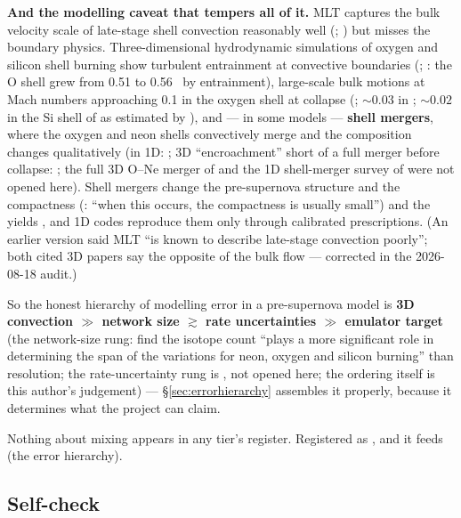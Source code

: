 \textbf{And the modelling caveat that tempers all of it.} MLT captures the bulk
velocity scale of late-stage shell convection reasonably well
(\citealt{meakin2007}; \citealt{muller2016b}) but misses the boundary physics.
Three-dimensional hydrodynamic simulations of oxygen and silicon shell burning
show turbulent entrainment at convective boundaries (\citealt{meakin2007};
\citealt{muller2016b}: the O shell grew from 0.51 to 0.56~\Msun{} by
entrainment), large-scale bulk motions at Mach numbers approaching 0.1 in the
oxygen shell at collapse (\citealt{muller2016b}; ${\sim}0.03$ in
\citealt{meakin2007}; ${\sim}0.02$ in the Si shell of \citealt{couch2015} as
estimated by \citealt{muller2016b}), and --- in some models --- \textbf{shell
mergers}, where the oxygen and neon shells convectively merge and the
composition changes qualitatively (in 1D: \citealt{sukhbold2018}; 3D
``encroachment'' short of a full merger before collapse: \citealt{muller2016a};
the full 3D O--Ne merger of \citealt{yadav2020} and the 1D shell-merger survey
of \citealt{collins2018} were not opened here). Shell mergers change the
pre-supernova structure and the compactness (\citealt{sukhbold2018}: ``when this
occurs, the compactness is usually small'') and the yields
\provtag{\textsc{[assumed]}}, and 1D codes reproduce them only through
calibrated prescriptions. (An earlier version said MLT ``is known to describe
late-stage convection poorly''; both cited 3D papers say the opposite of the
bulk flow --- corrected in the 2026-08-18 audit.)

So the honest hierarchy of modelling error in a pre-supernova model is
\textbf{3D convection $\gg$ network size $\gtrsim$ rate uncertainties $\gg$
emulator target} (the network-size rung: \citealt{farmer2016} find the isotope
count ``plays a more significant role in determining the span of the variations
for neon, oxygen and silicon burning'' than resolution; the rate-uncertainty
rung is \citealt{fields2018}, not opened here; the ordering itself is this
author's judgement) --- \S\ref{sec:errorhierarchy} assembles it properly,
because it determines what the project can claim.

Nothing about mixing appears in any tier's register. Registered as ,
and it feeds  (the error hierarchy).

\subsection{Self-check}
\label{sec:selfcheck-engine}

